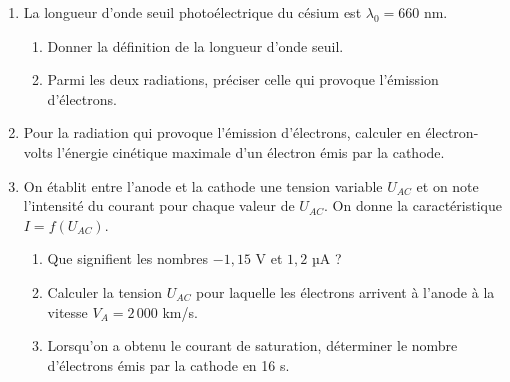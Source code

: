 \documentclass[11pt]{article}
\begin{document}
\begin{enumerate}
  \item La longueur d'onde seuil photoélectrique du césium est $\lambda_0 = 660$ nm.
  \begin{enumerate}[label=\alph*.]
    \item Donner la définition de la longueur d'onde seuil.
    \item Parmi les deux radiations, préciser celle qui provoque l'émission d'électrons.
  \end{enumerate}
  \item Pour la radiation qui provoque l'émission d'électrons, calculer en électron-volts l'énergie cinétique maximale d'un électron émis par la cathode.
  \item On établit entre l'anode et la cathode une tension variable $U_{AC}$ et on note l'intensité du courant pour chaque valeur de $U_{AC}$. On donne la caractéristique $I = f(U_{AC})$.

  \begin{center}
  \end{center}

  \begin{enumerate}[label=\alph*.]
    \item Que signifient les nombres $-1{,}15$ V et $1{,}2$ µA ?
    \item Calculer la tension $U_{AC}$ pour laquelle les électrons arrivent à l'anode à la vitesse $V_A = 2\,000$ km/s.
    \item Lorsqu'on a obtenu le courant de saturation, déterminer le nombre d'électrons émis par la cathode en 16 s.
  \end{enumerate}
\end{enumerate}
\end{document}
